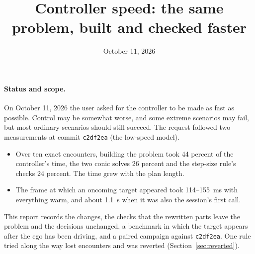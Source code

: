 \documentclass[11pt]{article}
\title{Controller speed: the same problem, built and checked faster}
\author{}
\date{October 11, 2026}
\begin{document}
\maketitle
\paragraph{Status and scope.}
On October 11, 2026 the user asked for the controller to be made as fast as
possible. Control may be somewhat worse, and some extreme scenarios may fail,
but most ordinary scenarios should still succeed. The request followed two
measurements at commit \texttt{c2df2ea} (the low-speed model).
\begin{itemize}
\item Over ten exact encounters, building the problem took 44 percent of the
  controller's time, the two conic solves 26 percent and the step-size
  rule's checks 24 percent. The time grew with the plan length.
\item The frame at which an oncoming target appeared took 114--155~ms with
  everything warm, and about 1.1~s when it was also the session's first
  call.
\end{itemize}
This report records the changes, the checks that the rewritten parts leave
the problem and the decisions unchanged, a benchmark in which the target
appears after the ego has been driving, and a paired campaign against
\texttt{c2df2ea}. One rule tried along the way lost encounters and was
reverted (Section~\ref{sec:reverted}).
\end{document}
